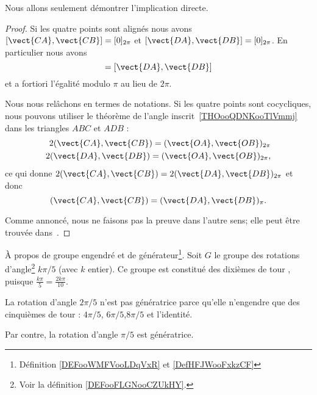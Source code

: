 Nous allons seulement démontrer l'implication directe.
\begin{proof}
    Si les quatre points sont alignés nous avons \( [\vect{ CA },\vect{ CB }]=[0]_{2\pi}\) et \( [\vect{ DA },\vect{ DB }]=[0]_{2\pi}\). En particulier nous avons
    \begin{equation}
        [\vect{ CA },\vect{ CB }]=[\vect{ DA },\vect{ DB }]
    \end{equation}
    et a fortiori l'égalité modulo \( \pi\) au lieu de \( 2\pi\).

    Nous nous relâchons en termes de notations. Si les quatre points sont cocycliques, nous pouvons utiliser le théorème de l'angle inscrit~\ref{THOooQDNKooTlVmmj} dans les triangles \( ABC\) et \( ADB\) :
    \begin{subequations}
        \begin{align}
            2(\vect{ CA },\vect{ CB })=(\vect{ OA },\vect{ OB })_{2\pi}\\
            2(\vect{ DA },\vect{ DB })=(\vect{ OA },\vect{ OB })_{2\pi},
        \end{align}
    \end{subequations}
    ce qui donne \(  2(\vect{ CA },\vect{ CB })=2(\vect{ DA },\vect{ DB })_{2\pi}  \) et donc
    \begin{equation}
        (\vect{ CA },\vect{ CB })=(\vect{ DA },\vect{ DB })_{\pi}.
    \end{equation}

    Comme annoncé, nous ne faisons pas la preuve dans l'autre sens; elle peut être trouvée dans~\cite{ooRGSCooNgALYH}.
\end{proof}

\begin{example}     \label{EXooOXAAooZMdDfP}
    À propos de groupe engendré et de générateur\footnote{Définition \ref{DEFooWMFVooLDqVxR} et \ref{DefHFJWooFxkzCF}}. Soit \( G\) le groupe des rotations d'angle\footnote{Voir la définition \ref{DEFooFLGNooCZUkHY}.} \( k\pi/5\) (avec \( k \) entier). Ce groupe est constitué des \og{} dixièmes de tour \fg{}, puisque \( \frac{k\pi} 5 = \frac{2k\pi}{10}.\)
    
     La rotation d'angle \( 2 \pi/5\)  n'est pas génératrice parce qu'elle n'engendre que des \og{} cinquièmes de tour \fg{} : \( 4 \pi/5\), \( 6 \pi/ 5\),\( 8\pi/5\) et l'identité.
     
     Par contre, la rotation d'angle \( \pi/5\) est génératrice.
\end{example}

